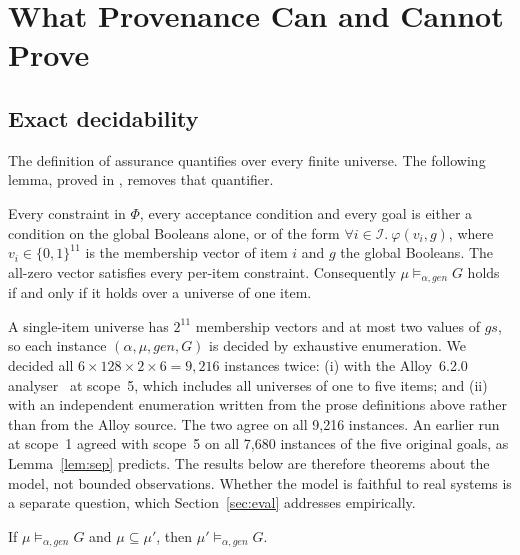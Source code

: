 \section{What Provenance Can and Cannot Prove}\label{sec:results}

\subsection{Exact decidability}

The definition of assurance quantifies over every finite universe. The following lemma,
proved in \proofsloc, removes that quantifier.

\begin{lemma}[Separability]\label{lem:sep}
Every constraint in $\Phi$, every acceptance condition and every goal is either a
condition on the global Booleans alone, or of the form
$\forall i\in\mathcal I.\ \varphi(v_i,g)$, where $v_i\in\{0,1\}^{11}$ is the membership
vector of item $i$ and $g$ the global Booleans. The all-zero vector satisfies every
per-item constraint. Consequently $\mu\models_{\alpha,\mathit{gen}}G$ holds if and only if
it holds over a universe of one item.
\end{lemma}

A single-item universe has $2^{11}$ membership vectors and at most two values of
$\mathit{gs}$, so each instance $(\alpha,\mu,\mathit{gen},G)$ is decided by exhaustive
enumeration. We decided all $6\times 128\times 2\times 6 = 9{,}216$ instances twice:
(i) with the Alloy~6.2.0 analyser~\cite{jackson2019alloy} at scope~5, which includes all
universes of one to five items; and (ii) with an independent enumeration written from the
prose definitions above rather than from the Alloy source. The two agree on all
9,216 instances. An earlier run at scope~1 agreed with scope~5 on all 7,680 instances of
the five original goals, as Lemma~\ref{lem:sep} predicts. The results below are therefore
theorems about the model, not bounded observations. Whether the model is faithful to real
systems is a separate question, which Section~\ref{sec:eval} addresses empirically.

\begin{proposition}[Monotonicity]\label{prop:mono}
If $\mu\models_{\alpha,\mathit{gen}}G$ and $\mu\subseteq\mu'$, then
$\mu'\models_{\alpha,\mathit{gen}}G$.
\end{proposition}

